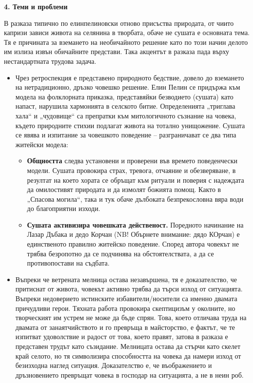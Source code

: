 \documentclass[12pt,a4paper]{article}
\begin{document}
\vspace{0.1cm}

\noindent 
\textbf{4. Теми и проблеми}
\vspace{0.1cm}
 
\indent В разказа типично по елинпелиновски отново присъства природата, от чиито капризи зависи живота на селянина в творбата, обаче не сушата е основната тема. Тя е причината за вземането на необичайното решение като по този начин делото им излиза извън обичайните представи. Така акцентът в разказа пада върху нестандартната трудова задача.

\begin{itemize}[leftmargin=*, noitemsep, topsep=2.pt, parsep=0pt] 
    \item Чрез ретроспекция е представено природното бедствие, довело до вземането на нетрадиционно, дръзко човешко решение. Елин Пелин се придържа към модела на фолклорната приказка, представяйки безводието (сушата) като напаст, нарушила хармонията в селското битие. Определенията „триглава хала“ и „чудовище“ са препратки към митологичното съзнание на човека, където природните стихии подлагат живота на тотално унищожение. Сушата се явява и изпитание за човешкото поведение – разграничават се два типа житейски модела: 
    \begin{itemize}[leftmargin=*] 
        \item \textbf{Общността} следва установени и проверени във времето поведенчески модели. Сушата провокира страх, тревога, отчаяние и обезверяване, в резултат на което хората се обръщат към ритуали и поверия с надеждата да омилостивят природата и да измолят божията помощ. Както в „Спасова могила“, така и тук обаче дълбоката безпрекословна вяра води до благоприятни изходи. 
        \item \textbf{Сушата активизира човешката действеност.} Поредното начинание на Лазар Дъбака и дедо Корчан (NB! Обърнете внимание: дядо КОрчан) е единственото правилно житейско поведение. Според автора човекът не трябва безропотно да се подчинява на обстоятелствата, а да се противопостави на съдбата. 
    \end{itemize} 
\end{itemize}

\begin{itemize}[leftmargin=*]
\vspace{-0.2cm}
\item Въпреки че ветрената мелница остава незавършена, тя е доказателство, че притиснат от живота, човекът активно трябва да търси изход от ситуацията. Въпреки недоверието истинските избавители/носители са именно двамата причудливи герои. Тяхната работа провокира скептицизъм у околните, но творческият им устрем не може да бъде спрян. Това, което отличава труда на двамата от занаятчийството и го превръща в майсторство, е фактът, че те изпитват удоволствие и радост от това, което правят, затова в разказа е представен трудът като съзидание. Мелницата остава да стърчи като скелет край селото, но тя символизира способността на човека да намери изход от безизходна наглед ситуация. Доказателство е, че въображението и дръзновението превръщат човека в господар на ситуацията, а не в неин роб. 
\end{itemize}
\end{document}
